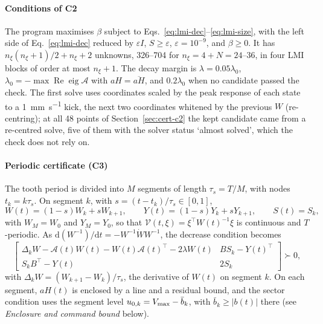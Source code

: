 \paragraph{Conditions of C2}
The program maximises $\beta$ subject to Eqs.~\eqref{eq:lmi-dec}--\eqref{eq:lmi-size}, with the left side of Eq.~\eqref{eq:lmi-dec} reduced by $\varepsilon I$, $S\ge\varepsilon$, $\varepsilon=10^{-9}$, and $\beta\ge0$. It has $n_\xi(n_\xi+1)/2+n_\xi+2$ unknowns, 326--704 for $n_\xi=4+N=24$--36, in four LMI blocks of order at most $n_\xi+1$. The decay margin is $\lambda=0.05\lambda_0$, $\lambda_0=-\max\operatorname{Re}\operatorname{eig}\mathcal A$ with $aH=\overline{aH}$, and $0.2\lambda_0$ when no candidate passed the check. The first solve uses coordinates scaled by the peak response of each state to a \SI{1}{\milli\metre\per\second} kick, the next two coordinates whitened by the previous $W$ (re-centring); at all 48 points of Section~\ref{sec:cert-c2} the kept candidate came from a re-centred solve, five of them with the solver status `almost solved', which the check does not rely on.

\paragraph{Periodic certificate (C3)}
The tooth period is divided into $M$ segments of length $\tau_s=T/M$, with nodes $t_k=k\tau_s$. On segment $k$, with $s=(t-t_k)/\tau_s\in[0,1]$,
\begin{equation}\label{eq:Wt}
W(t)=(1-s)W_k+sW_{k+1},\qquad Y(t)=(1-s)Y_k+sY_{k+1},\qquad S(t)=S_k,
\end{equation}
with $W_M=W_0$ and $Y_M=Y_0$, so that $\mathcal V(t,\xi)=\xi^\top W(t)^{-1}\xi$ is continuous and $T$-periodic. As $\mathrm d(W^{-1})/\mathrm dt=-W^{-1}\dot WW^{-1}$, the decrease condition becomes
\begin{equation}\label{eq:lmi-per}
\begin{bmatrix}\Delta_kW-\mathcal A(t)W(t)-W(t)\mathcal A(t)^\top-2\lambda W(t) & BS_k-Y(t)^\top\\ S_kB^\top-Y(t) & 2S_k\end{bmatrix}\succ0,
\end{equation}
with $\Delta_kW=(W_{k+1}-W_k)/\tau_s$, the derivative of $W(t)$ on segment $k$. On each segment, $aH(t)$ is enclosed by a line and a residual bound, and the sector condition uses the segment level $u_{0,k}=V_{\max}-\bar b_k$, with $\bar b_k\ge\lvert b(t)\rvert$ there (see \emph{Enclosure and command bound} below).

